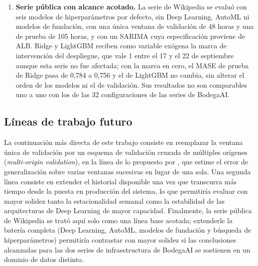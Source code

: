 \begin{enumerate}
  Prophet y NeuralProphet y del período estacional del MASE, sobre la base de un historial que, con 86
  días, apenas cubre unas doce semanas completas; un historial más extenso podría justificar su
  incorporación.
  \item \textbf{Serie pública con alcance acotado.} La serie de Wikipedia se evaluó con seis modelos de
  hiperparámetros por defecto, sin Deep Learning, AutoML ni modelos de fundación, con una única ventana de
  validación de 48 horas y una de prueba de 105 horas, y con un SARIMA cuya especificación proviene de ALB.
  Ridge y LightGBM reciben como variable exógena la marca de intervención del despliegue, que vale 1 entre el 17 y el 22 de septiembre aunque esta serie no fue afectada; con la marca en cero, el MASE de prueba de Ridge pasa de 0,784 a 0,756 y el de LightGBM no cambia, sin alterar el orden de los modelos ni el de validación.
  Sus resultados no son comparables uno a uno con los de las 32 configuraciones de las series de BodegaAI.
\end{enumerate}

\subsection{Líneas de trabajo futuro}

La continuación más directa de este trabajo consiste en reemplazar la ventana única de validación por un
esquema de validación cruzada de múltiples orígenes (\emph{multi-origin validation}), en la línea de lo
propuesto por \textcite{hyndman2021}, que estime el error de generalización sobre varias ventanas
sucesivas en lugar de una sola. Una segunda línea consiste en extender el historial disponible una vez que
transcurra más tiempo desde la puesta en producción del sistema, lo que permitiría evaluar con mayor
solidez tanto la estacionalidad semanal como la estabilidad de las arquitecturas de Deep Learning de mayor
capacidad. Finalmente, la serie pública de Wikipedia se trató aquí solo como una línea base acotada; extenderle la
batería completa (Deep Learning, AutoML, modelos de fundación y búsqueda de hiperparámetros) permitiría
contrastar con mayor solidez si las conclusiones alcanzadas para las dos series de infraestructura de
BodegaAI se sostienen en un dominio de datos distinto.


